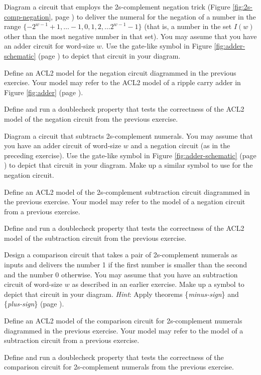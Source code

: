\begin{ExerciseList}
\Exercise Diagram a circuit that employs
the 2s-complement negation trick (Figure \ref{fig:2s-comp-negation},
page \pageref{fig:2s-comp-negation}) to deliver the
numeral for the negation of a number in the range
$\{-2^{w-1}+1, \dots -1, 0, 1, 2, \dots 2^{w-1}-1\}$
(that is, a number in the set $I(w)$ other than the
most negative number in that set).
You may assume that you have an adder circuit for
word-size $w$. Use the gate-like symbol
in Figure \ref{fig:adder-schematic} (page \pageref{fig:adder-schematic})
to depict that circuit in your diagram.

\Exercise Define an ACL2 model for the negation circuit
diagrammed in the previous exercise.
Your model may refer to the ACL2 model
of a ripple carry adder in
Figure \ref{fig:adder} (page \pageref{fig:adder}).

\Exercise Define and run a doublecheck property that
tests the correctness of
the ACL2 model of the negation circuit
from the previous exercise.

\Exercise Diagram a circuit that subtracts 2s-complement numerals.
You may assume that you have an adder circuit of word-size $w$
and a negation circuit (as in the preceding exercise).
Use the gate-like symbol
in Figure \ref{fig:adder-schematic} (page \pageref{fig:adder-schematic})
to depict that circuit in your diagram.
Make up a similar symbol to use for the negation circuit.

\Exercise Define an ACL2 model of the
2s-complement subtraction circuit diagrammed in the previous exercise.
Your model may refer to the model of a negation circuit
from a previous exercise.

\Exercise Define and run a doublecheck property that
tests the correctness of
the ACL2 model of the subtraction circuit
from the previous exercise.

\Exercise Design a comparison circuit that takes a pair of
2s-complement numerals as inputs and delivers the number 1
if the first number is smaller than the second
and the number 0 otherwise.
You may assume that you have an subtraction circuit of word-size $w$
as described in an earlier exercise. Make up a symbol to depict
that circuit in your diagram.
\emph{Hint}: Apply theorems \{\emph{minus-sign}\} and \{\emph{plus-sign}\}
(page \pageref{minus-sign}).

\Exercise Define an ACL2 model of the comparison circuit for 2s-complement numerals
diagrammed in the previous exercise.
Your model may refer to the model of a subtraction circuit from a previous exercise.

\Exercise Define and run a doublecheck property
that tests the correctness of
the comparison circuit for 2s-complement numerals from the previous exercise.

\end{ExerciseList}

